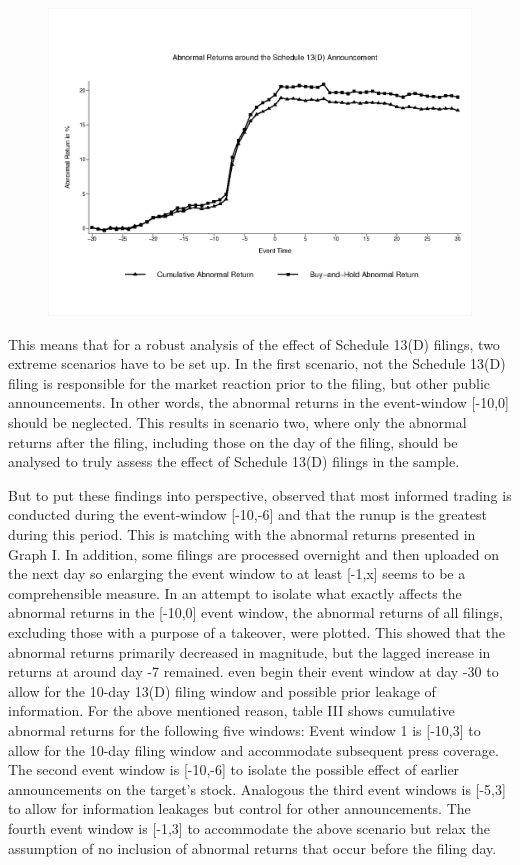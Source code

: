 \documentclass[12pt]{article}
\begin{document}
\begin{figure}
	\includegraphics{Abnormal_Returns.eps} \label{AR both}
\end{figure} 

This means that for a robust analysis of the effect of Schedule 13(D) filings, two extreme scenarios have to be set up. 
In the first scenario, not the Schedule 13(D) filing is responsible for the market reaction prior to the filing, but other public announcements. In other words, the abnormal returns  in the event-window [-10,0] should be neglected. 
This results in scenario two, where only the abnormal returns after the filing, including those on the day of the filing, should be analysed to truly assess the effect of Schedule 13(D) filings in the sample.

But to put these findings into perspective, \citet[p.32]{Brigida2012} observed that most informed trading is conducted during the event-window [-10,-6] and that the runup is the greatest during this period. This is matching with the abnormal returns presented in Graph I. In addition, some filings are processed overnight and then uploaded on the next day so enlarging the event window to at least [-1,x] seems to be a comprehensible measure. 
In an attempt to isolate what exactly affects the abnormal returns in the [-10,0] event window, the abnormal returns of all filings, excluding those with a purpose of a takeover, were plotted. This showed that the abnormal returns primarily decreased in magnitude, but the lagged increase in returns at around day -7 remained. \citet[207]{Klein2009} even begin their event window at day -30 to allow for the 10-day 13(D) filing window and possible prior leakage of information. 
For the above mentioned reason, table III shows cumulative abnormal returns for the following five windows: Event window 1 is [-10,3] to allow for the 10-day filing window and accommodate subsequent press coverage. The second event window is [-10,-6] to isolate the possible effect of earlier announcements on the target's stock. Analogous the third event windows is [-5,3] to allow for information leakages but control for other announcements. The fourth event window is [-1,3] to accommodate the above scenario but relax the assumption of no inclusion of abnormal returns that occur before the filing day. 
\end{document}
